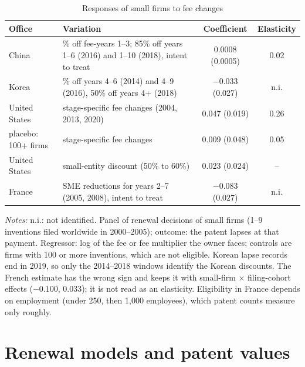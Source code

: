 \begin{table}[ht]
\centering
\begin{threeparttable}
\caption{Responses of small firms to fee changes}\label{tab:fees}
\small
\begin{tabular}{@{}l>{\raggedright\arraybackslash}p{}cc@{}}
\toprule
Office & Variation & Coefficient & Elasticity \\
\midrule
China & 70\% off fee-years 1--3; 85\% off years 1--6 (2016) and 1--10 (2018), intent to treat & 0.0008 (0.0005) & 0.02 \\
Korea & 30\% off years 4--6 (2014) and 4--9 (2016), 50\% off years 4+ (2018) & $-0.033$ (0.027) & n.i. \\
United States & stage-specific fee changes (2004, 2013, 2020) & 0.047 (0.019) & 0.26 \\
\quad placebo: 100+ firms & stage-specific fee changes & 0.009 (0.048) & 0.05 \\
United States & 2022 small-entity discount (50\% to 60\%) & 0.023 (0.024) & -- \\
France & SME reductions for years 2--7 (2005, 2008), intent to treat & $-0.083$ (0.027) & n.i. \\
\bottomrule
\end{tabular}
\begin{tablenotes}\footnotesize
\item \emph{Notes:} n.i.: not identified. Panel of renewal decisions of small firms (1--9 inventions filed worldwide in 2000--2005); outcome:
the patent lapses at that payment. Regressor: log of the fee or fee multiplier the owner faces; controls are firms with
100 or more inventions, which are not eligible. Korean lapse records end in 2019, so only the 2014--2018 windows identify the Korean discounts. The French
estimate has the wrong sign and keeps it with small-firm $\times$ filing-cohort effects ($-0.100$, 0.033); it is not
read as an elasticity. Eligibility in France depends on employment (under 250, then 1{,}000 employees), which patent
counts measure only roughly.
\end{tablenotes}
\end{threeparttable}
\end{table}

\section{Renewal models and patent values}\label{app:models}

